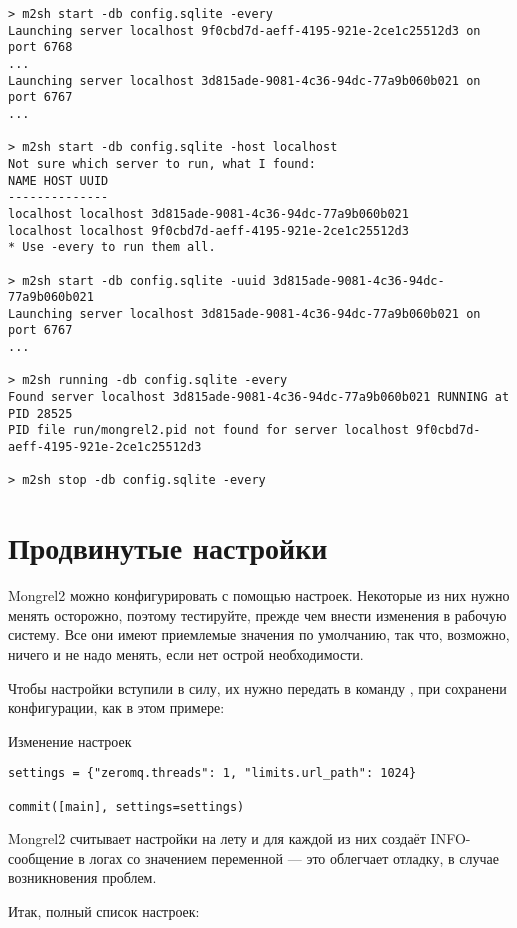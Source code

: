 \begin{Verbatim}
> m2sh start -db config.sqlite -every
Launching server localhost 9f0cbd7d-aeff-4195-921e-2ce1c25512d3 on port 6768
...
Launching server localhost 3d815ade-9081-4c36-94dc-77a9b060b021 on port 6767
...

> m2sh start -db config.sqlite -host localhost
Not sure which server to run, what I found:
NAME HOST UUID
--------------
localhost localhost 3d815ade-9081-4c36-94dc-77a9b060b021
localhost localhost 9f0cbd7d-aeff-4195-921e-2ce1c25512d3
* Use -every to run them all.

> m2sh start -db config.sqlite -uuid 3d815ade-9081-4c36-94dc-77a9b060b021
Launching server localhost 3d815ade-9081-4c36-94dc-77a9b060b021 on port 6767
...

> m2sh running -db config.sqlite -every
Found server localhost 3d815ade-9081-4c36-94dc-77a9b060b021 RUNNING at PID 28525
PID file run/mongrel2.pid not found for server localhost 9f0cbd7d-aeff-4195-921e-2ce1c25512d3

> m2sh stop -db config.sqlite -every
\end{Verbatim}

\section{Продвинутые настройки}

Mongrel2 можно конфигурировать с помощью настроек. Некоторые из них
нужно менять осторожно, поэтому тестируйте, прежде чем внести
изменения в рабочую систему. Все они имеют приемлемые значения по
умолчанию, так что, возможно, ничего и не надо менять, если нет острой
необходимости.

Чтобы настройки вступили в силу, их нужно передать в команду
, при сохранени конфигурации, как в этом примере:

\begin{code}{Изменение настроек}
\begin{lstlisting}
settings = {"zeromq.threads": 1, "limits.url_path": 1024}

commit([main], settings=settings)
\end{lstlisting}
\end{code}

Mongrel2 считывает настройки на лету и для каждой из них создаёт
INFO-сообщение в логах со значением переменной --- это облегчает
отладку, в случае возникновения проблем.

Итак, полный список настроек:


